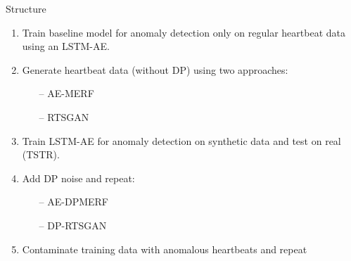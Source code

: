 \begin{frame}{Structure}
    \begin{enumerate}
        \item Train baseline model for anomaly detection only on regular heartbeat data using an LSTM-AE.
        \item Generate heartbeat data (without DP) using two approaches:
        \begin{itemize}
            \item[--] AE-MERF
            \item[--] RTSGAN
        \end{itemize}
        \item Train LSTM-AE for anomaly detection on synthetic data and test on real (TSTR).
        \item Add DP noise and repeat:
        \begin{itemize}
            \item[--] AE-DPMERF
            \item[--] DP-RTSGAN
        \end{itemize}
        \item Contaminate training data with anomalous heartbeats and repeat
    \end{enumerate}
\end{frame}


